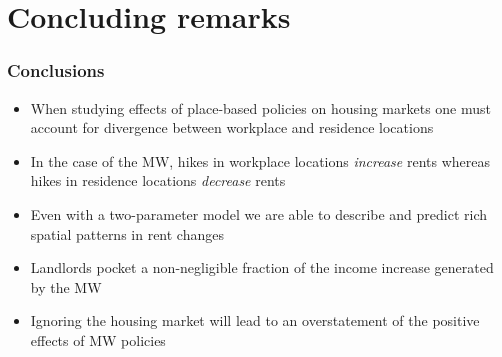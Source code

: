 \documentclass[aspectratio=169, t]{beamer}
\begin{document}
    


\section{Concluding remarks}

\begin{frame}
    \frametitle{Conclusions}
    
    \begin{itemize}
        \item When studying effects of place-based policies on housing markets one 
        must account for divergence between workplace and residence locations
        \vspace{2mm}
        \item In the case of the MW, hikes in workplace locations \textit{increase} rents
        whereas hikes in residence locations \textit{decrease} rents
        \vspace{2mm}
        \item Even with a two-parameter model we are able to describe and predict 
        rich spatial patterns in rent changes
        \vspace{2mm}
        \item Landlords pocket a non-negligible fraction of the income increase 
        generated by the MW
        \vspace{2mm}
        \item Ignoring the housing market will lead to an overstatement of the positive
        effects of MW policies
    \end{itemize}
    
\end{frame}
\end{document}
